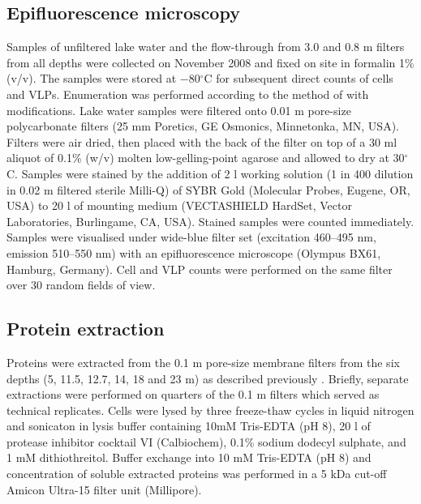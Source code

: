 \subsection{Epifluorescence microscopy}
Samples of unfiltered lake water and the flow-through from 3.0 and 0.8 \textmu{}m filters from all depths were collected on November 2008 and fixed on site in formalin 1\% (v/v). 
The samples were stored at $-$80$^{\circ}$C for subsequent direct counts of cells and \acp{VLP}. 
Enumeration was performed according to the method of \citet{Patel2007} with modifications. 
Lake water samples were filtered onto 0.01 \textmu{}m pore-size polycarbonate filters (25 mm Poretics, \textsc{GE} Osmonics, Minnetonka, \textsc{MN}, \textsc{USA}). 
Filters were air dried, then placed with the back of the filter on top of a 30 ml aliquot of 0.1\% (w/v) molten low-gelling-point agarose and allowed to dry at 30$^{\circ}$C. 
Samples were stained by the addition of 2 \textmu{}l working solution (1 in 400 dilution in 0.02 \textmu{}m filtered sterile Milli-Q) of \textsc{SYBR} Gold (Molecular Probes, Eugene, \textsc{OR}, \textsc{USA}) to 20 \textmu{}l of mounting medium (\textsc{VECTASHIELD} HardSet, Vector Laboratories, Burlingame, \textsc{CA}, \textsc{USA}). 
Stained samples were counted immediately.
Samples were visualised under wide-blue filter set (excitation 460--495 nm, emission 510--550 nm) with an epifluorescence microscope (Olympus BX61, Hamburg, Germany).
Cell and \ac{VLP} counts were performed on the same filter over 30 random fields of view.

\subsection{Protein extraction}
Proteins were extracted from the 0.1 \textmu{}m pore-size membrane filters from the six depths (5, 11.5, 12.7, 14, 18 and 23 m) as described previously \cite{Ng2010a, Ng2010b, Lauro2011}.
Briefly, separate extractions were performed on quarters of the 0.1 \textmu{}m filters which served as technical replicates.
Cells were lysed by three freeze-thaw cycles in liquid nitrogen and sonicaton in lysis buffer containing 10mM Tris-EDTA (pH 8), 20 \textmu{}l of protease inhibitor cocktail VI (Calbiochem), 0.1\% sodium dodecyl sulphate, and 1 mM dithiothreitol.
Buffer exchange into 10 mM Tris-EDTA (pH 8) and concentration of soluble extracted proteins was performed in a 5 kDa cut-off Amicon Ultra-15 filter unit (Millipore).

